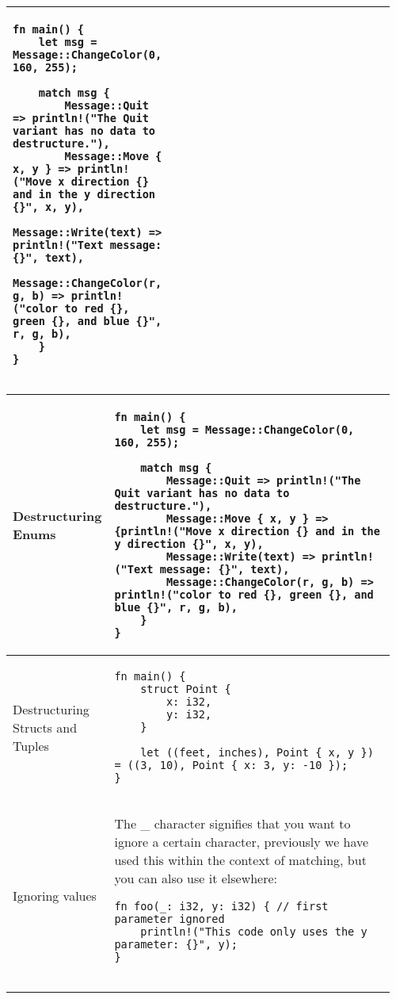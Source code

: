 \documentclass[main.tex,fontsize=8pt,paper=a4,paper=portrait,DIV=calc,]{scrartcl}
\begin{document}
\begin{table}[ht!]
\begin{tabular}{|m{0.2\linewidth}|m{0.755\linewidth}|}
\begin{lstlisting}
fn main() {
    let msg = Message::ChangeColor(0, 160, 255);

    match msg {
        Message::Quit => println!("The Quit variant has no data to destructure."),
        Message::Move { x, y } => println!("Move x direction {} and in the y direction {}", x, y),
        Message::Write(text) => println!("Text message: {}", text),
        Message::ChangeColor(r, g, b) => println!("color to red {}, green {}, and blue {}", r, g, b),
    }
}
\end{lstlisting}\\
\hline
\end{tabular}
\end{table}
\pagebreak
\begin{table}[ht!]
\begin{tabular}{|m{0.2\linewidth}|m{0.755\linewidth}|}
\hline
Destructuring Enums & 
\begin{lstlisting}
fn main() {
    let msg = Message::ChangeColor(0, 160, 255);

    match msg {
        Message::Quit => println!("The Quit variant has no data to destructure."),
        Message::Move { x, y } => {println!("Move x direction {} and in the y direction {}", x, y),
        Message::Write(text) => println!("Text message: {}", text),
        Message::ChangeColor(r, g, b) => println!("color to red {}, green {}, and blue {}", r, g, b),
    }
}
\end{lstlisting}\\
\hline
Destructuring Structs and Tuples & 
\begin{lstlisting}
fn main() {
    struct Point {
        x: i32,
        y: i32,
    }

    let ((feet, inches), Point { x, y }) = ((3, 10), Point { x: 3, y: -10 });
}
\end{lstlisting}\\
\hline
Ignoring values & 
The \_ character signifies that you want to ignore a certain character, previously we have used this within the context of matching, but you can also use it elsewhere:\newline
\begin{lstlisting}
fn foo(_: i32, y: i32) { // first parameter ignored
    println!("This code only uses the y parameter: {}", y);
}


\end{lstlisting}
\end{tabular}
\end{table}
\end{document}
